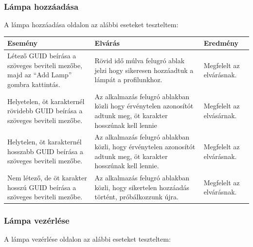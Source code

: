 \documentclass[a4paper,12pt]{report}
\begin{document}
\subsubsection{Lámpa hozzáadása}
    A lámpa hozzáadása oldalon az alábbi eseteket teszteltem:

\begin{center}
    \begin{tabular}{ | m{4.5cm} | m{4.5cm} | m{4.5cm} |}
        \hline
        Esemény & Elvárás & Eredmény \\ \hline
        Létező GUID beírása a szöveges beviteli mezőbe, majd az ``Add Lamp'' gombra kattintás. & Rövid idő múlva felugró ablak jelzi
        hogy sikeresen hozzáadtuk a lámpát a profilunkhoz. & Megfelelt az elvárásnak. \\ \hline
        Helyetelen, öt karakternél rövidebb GUID beírása a szöveges beviteli mezőbe. & Az alkalmazás felugró ablakban közli hogy érvénytelen
        azonosítót adtunk meg, öt karakter hosszúnak kell lennie & Megfelelt az elvásárnak. \\ \hline
        Helytelen, öt karakternél hosszabb GUID beírása a szöveges beviteli mezőbe. & Az alkalmazás felugró ablakban közli, hogy érvénytelen
        azonosítót adtunk meg, öt karakter hosszúnak kell lennie. & Megfelelt az elvárásnak. \\ \hline
        Nem létező, de öt karakter hosszú GUID beírása a szöveges beviteli mezőbe. & Az alkalmazás felugró ablakban közli, hogy sikertelen
        hozzáadás történt, próbálkozzunk újra. & Megfelelt az elvárásnak. \\ \hline
        \hline
    \end{tabular}
\end{center}

\subsubsection{Lámpa vezérlése}
    A lámpa vezérlése oldalon az alábbi eseteket teszteltem:
\end{document}
